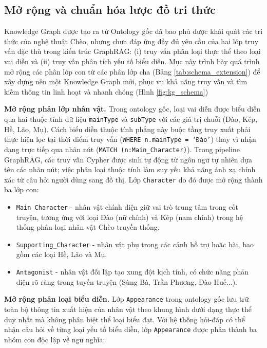 \subsection{Mở rộng và chuẩn hóa lược đồ tri thức}

Knowledge Graph được tạo ra từ Ontology gốc đã bao phủ được khái quát các tri thức của nghệ thuật Chèo, nhưng chưa đáp ứng đầy đủ yêu cầu của hai lớp truy vấn đặc thù trong kiến trúc GraphRAG: (i) truy vấn phân loại thực thể theo loại vai diễn và (ii) truy vấn phân tích yếu tố biểu diễn. Mục này trình bày quá trình mở rộng các phân lớp con từ các phân lớp cha (Bảng \ref{tab:schema_extension}) để xây dựng nên một Knowledge Graph mới, phục vụ khả năng truy vấn và tìm kiếm thông tin linh hoạt và nhanh chóng (Hình \ref{fig:kg_schema})

\textbf{Mở rộng phân lớp nhân vật.}
Trong ontology gốc, loại vai diễn được biểu diễn qua hai thuộc tính dữ liệu
\texttt{mainType} và \texttt{subType} với các giá trị chuỗi (Đào, Kép, Hề, Lão, Mụ). Cách biểu diễn thuộc tính phẳng này buộc tầng truy xuất phải thực hiện lọc tại thời điểm truy vấn (\texttt{WHERE n.mainType = `Đào'}) thay vì nhận dạng trực tiếp qua nhãn nút (\texttt{MATCH (n:Main\_Character)}). Trong pipeline GraphRAG, các truy vấn Cypher được sinh tự động từ ngôn ngữ tự nhiên dựa tên các nhãn nút; việc phân loại thuộc tính làm suy yếu khả năng ánh xạ chính xác từ câu hỏi người dùng sang đồ thị. Lớp \texttt{Character} do đó được mở rộng thành ba lớp con:

\begin{itemize}
  \item \texttt{Main\_Character} - nhân vật chính diện giữ vai trò trung tâm trong
    cốt truyện, tương ứng với loại Đào (nữ chính) và Kép (nam chính) trong hệ thống
    phân loại nhân vật Chèo truyền thống.
  \item \texttt{Supporting\_Character} - nhân vật phụ trong các cảnh hỗ trợ hoặc
    hài, bao gồm các loại Hề, Lão và Mụ.
  \item \texttt{Antagonist} - nhân vật đối lập tạo xung đột kịch tính, có chức
    năng phản diện rõ ràng trong tuyến truyện (Sùng Bà, Trần Phương, Đào Huế...).
\end{itemize}

\textbf{Mở rộng phân loại biểu diễn.}
Lớp \texttt{Appearance} trong ontology gốc lưu trữ toàn bộ thông tin xuất hiện của
nhân vật theo khung hình dưới dạng thực thể duy nhất mà không phân biệt thể loại biểu
đạt. Với hệ thống hỏi-đáp có thể nhận câu hỏi về từng loại yếu tố biểu diễn, lớp
\texttt{Appearance} được phân thành ba nhóm con độc lập về ngữ nghĩa:

